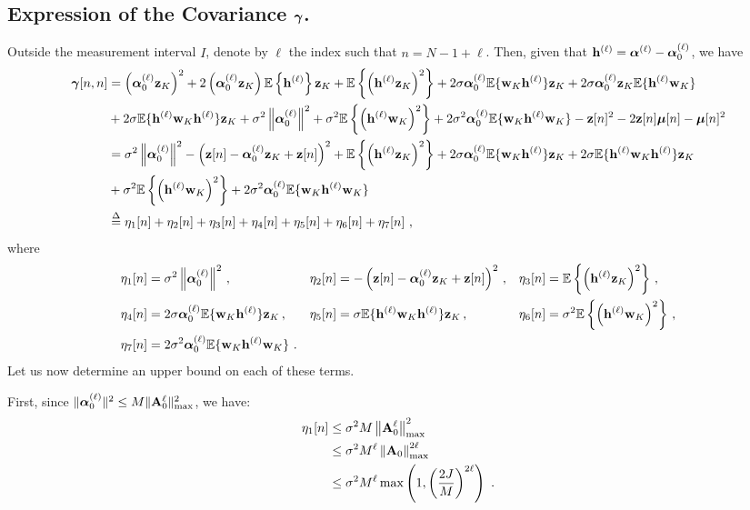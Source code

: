 \documentclass[journal,onecolumn]{IEEEtran}
\begin{document}
\subsection{Expression of the Covariance $\boldsymbol{\gamma}$.}

Outside the measurement interval $I$, denote by $\ell$ the index such that $n=N-1+\ell$. Then, given that ${\mathbf h}^{(\ell)} = \boldsymbol{\alpha}^{(\ell)} - \boldsymbol{\alpha}_0^{(\ell)}$, we have
\begin{align*}
\boldsymbol{\gamma}[n,n] &= \left( \boldsymbol{\alpha}_0^{(\ell)}{\mathbf z}_K\right)^2 + 2\left(\boldsymbol{\alpha}_0^{(\ell)}{\mathbf z}_K\right){\mathbb E}\left\{{\mathbf h}^{(\ell)}\right\}{\mathbf z}_K + {\mathbb E}\left\{\left({\mathbf h}^{(\ell)}{\mathbf z}_K\right)^2\right\} + 2\sigma\boldsymbol{\alpha}_0^{(\ell)}{\mathbb E}\{{\mathbf w}_K{\mathbf h}^{(\ell)}\}{\mathbf z}_K + 2\sigma\boldsymbol{\alpha}_0^{(\ell)}{\mathbf z}_K {\mathbb E}\{{\mathbf h}^{(\ell)}{\mathbf w}_K\} \\
& + 2\sigma{\mathbb E}\{{\mathbf h}^{(\ell)}{\mathbf w}_K{\mathbf h}^{(\ell)}\}{\mathbf z}_K +\sigma^2\left\|\boldsymbol{\alpha}_0^{(\ell)}\right\|^2 +\sigma^2{\mathbb E}\left\{\left({\mathbf h}^{(\ell)}{\mathbf w}_K\right)^2\right\}  + 2\sigma^2\boldsymbol{\alpha}_0^{(\ell)}{\mathbb E}\{{\mathbf w}_K{\mathbf h}^{(\ell)}{\mathbf w}_K\} -{\mathbf z}[n]^2 - 2{\mathbf z}[n]\boldsymbol{\mu}[n]- \boldsymbol{\mu}[n]^2 \\
&= \sigma^2\left\|\boldsymbol{\alpha}_0^{(\ell)}\right\|^2-\left( {\mathbf z}[n] - \boldsymbol{\alpha}_0^{(\ell)}{\mathbf z}_K+{\mathbf z}[n]\right)^2 + {\mathbb E}\left\{\left({\mathbf h}^{(\ell)}{\mathbf z}_K\right)^2\right\} + 2\sigma\boldsymbol{\alpha}_0^{(\ell)}{\mathbb E}\{{\mathbf w}_K{\mathbf h}^{(\ell)}\}{\mathbf z}_K+ 2\sigma{\mathbb E}\{{\mathbf h}^{(\ell)}{\mathbf w}_K{\mathbf h}^{(\ell)}\}{\mathbf z}_K \\
&+\sigma^2{\mathbb E}\left\{\left({\mathbf h}^{(\ell)}{\mathbf w}_K\right)^2\right\}  + 2\sigma^2\boldsymbol{\alpha}_0^{(\ell)}{\mathbb E}\{{\mathbf w}_K{\mathbf h}^{(\ell)}{\mathbf w}_K\}\\
&\overset{\Delta}{=} \eta_1[n] + \eta_2[n] + \eta_3[n] + \eta_4[n] + \eta_5[n] + \eta_6[n] + \eta_7[n]\ , 
\end{align*}
where
\begin{align*}
\eta_1[n] &= \sigma^2\left\|\boldsymbol{\alpha}_0^{(\ell)}\right\|^2 \,, & \eta_2[n] &= -\left( {\mathbf z}[n] - \boldsymbol{\alpha}_0^{(\ell)}{\mathbf z}_K+{\mathbf z}[n]\right)^2 \,,
& \eta_3[n] &= {\mathbb E}\left\{\left({\mathbf h}^{(\ell)}{\mathbf z}_K\right)^2\right\}\,, \\
\eta_4[n] &= 2\sigma\boldsymbol{\alpha}_0^{(\ell)}{\mathbb E}\{{\mathbf w}_K{\mathbf h}^{(\ell)}\}{\mathbf z}_K\,,
& \eta_5[n] &= \sigma{\mathbb E}\{{\mathbf h}^{(\ell)}{\mathbf w}_K{\mathbf h}^{(\ell)}\}{\mathbf z}_K\,,
& \eta_6[n] &= \sigma^2{\mathbb E}\left\{\left({\mathbf h}^{(\ell)}{\mathbf w}_K\right)^2\right\}\,, \\
\eta_7[n] &= 2\sigma^2\boldsymbol{\alpha}_0^{(\ell)}{\mathbb E}\{{\mathbf w}_K{\mathbf h}^{(\ell)}{\mathbf w}_K\} \ . 
\end{align*}
Let us now determine an upper bound on each of these terms. 

First, since $\|\boldsymbol{\alpha}_0^{(\ell)}\|^2\leq M\|{\mathbf A}_0^{\ell}\|_{\max}^2$, we have:
\begin{align}
\nonumber
\eta_1[n] &\leq \sigma^2M\left\|\bA_0^{\ell}\right\|_{\max}^2 \\
\nonumber
&\leq\sigma^2M^{\ell}\left\|\bA_0\right\|^{2\ell}_{\max} \\
&\leq \sigma^2 M^{\ell}\max\left(1,\left(\frac{2J}{M}\right)^{2\ell}\right)\ .
\label{eq:sum1}
\end{align}
\end{document}
